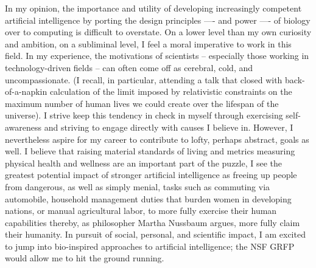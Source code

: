 \documentclass[12pt]{book}
\begin{document}
In my opinion, the importance and utility of developing increasingly competent artificial intelligence by porting the design principles —- and power —- of biology over to computing is difficult to overstate. On a lower level than my own curiosity and ambition, on a subliminal level, I feel a moral imperative to work in this field. In my experience, the motivations of scientists -- especially those working in technology-driven fields -- can often come off as cerebral, cold, and uncompassionate. (I recall, in particular, attending a talk that closed with back-of-a-napkin calculation of the limit imposed by relativistic constraints on the maximum number of human lives we could create over the lifespan of the universe). I strive keep this tendency in check in myself through exercising self-awareness and striving to engage directly with causes I believe in. However, I nevertheless aspire for my career to contribute to lofty, perhaps abstract, goals as well. I believe that raising material standards of living and metrics measuring physical health and wellness are an important part of the puzzle, I see the greatest potential impact of stronger artificial intelligence as freeing up people from dangerous, as well as simply menial, tasks such as commuting via automobile, household management duties that burden women in developing nations, or manual agricultural labor, to more fully exercise their human capabilities thereby, as philosopher Martha Nussbaum argues, more fully claim their humanity. In pursuit of social, personal, and scientific impact, I am excited to jump into bio-inspired approaches to artificial intelligence; the NSF GRFP would allow me to hit the ground running.
\end{document}
